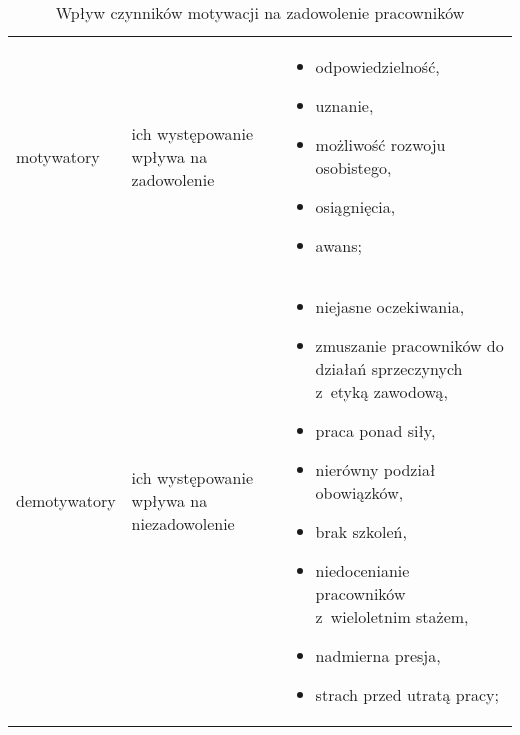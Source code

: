 \noindent\begin{minipage}{\textwidth}
             \begin{table}[H]
                 \raggedright\caption{Wpływ czynników motywacji na zadowolenie pracowników\label{tabela:trychotomia}}
                 \begin{center}
                     \begin{tabular}{|P{.2\textwidth}|P{.2\textwidth}|P{.5\textwidth}|}

                         \hline
                          &
                          &
                          \\
                         \hline

                         motywatory &
                         ich występowanie wpływa na zadowolenie &
                         \begin{itemize}
                             \item odpowiedzielność,
                             \item uznanie,
                             \item możliwość rozwoju osobistego,
                             \item osiągnięcia,
                             \item awans;
                             \end{itemize}\\
                         \hline

                         demotywatory &
                         ich występowanie wpływa na niezadowolenie &
                         \begin{itemize}
                             \item niejasne oczekiwania,
                             \item zmuszanie pracowników do działań sprzeczynych z~etyką zawodową,
                             \item praca ponad siły,
                             \item nierówny podział obowiązków,
                             \item brak szkoleń,
                             \item niedocenianie pracowników z~wieloletnim stażem,
                             \item nadmierna presja,
                             \item strach przed utratą pracy;
                             \end{itemize}\\
                         \hline


\end{tabular}
\end{center}
\end{table}
\end{minipage}

